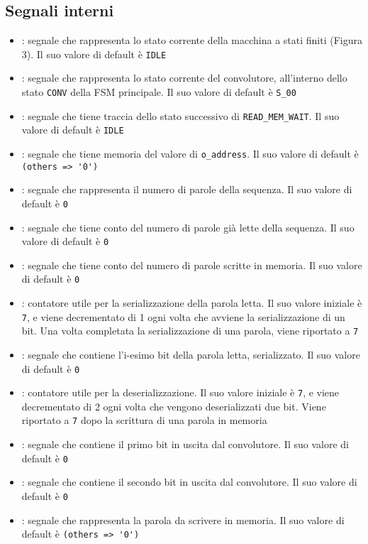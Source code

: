 \documentclass{article}
\begin{document}
\subsection{Segnali interni}
\begin{itemize}
    \item[\verb^current\_state^]: segnale che rappresenta lo stato corrente della macchina a stati finiti (Figura 3). Il suo valore di default è \verb^IDLE^
    \item[\verb^conv\_current\_state^]: segnale che rappresenta lo stato corrente del convolutore, all'interno dello stato \verb^CONV^ della FSM principale. Il suo valore di default è \verb^S_00^
    \item[\verb^return\_state^]: segnale che tiene traccia dello stato successivo di \verb^READ_MEM_WAIT^. Il suo valore di default è \verb^IDLE^
    \item[\verb^o\_address\_copy^]: segnale che tiene memoria del valore di \verb^o_address^. Il suo valore di default è \verb^(others => '0')^
    \item[\verb^words\_number^]: segnale che rappresenta il numero di parole della sequenza. Il suo valore di default è \verb^0^
    \item[\verb^count\_read^]: segnale che tiene conto del numero di parole già lette della sequenza. Il suo valore di default è \verb^0^
    \item[\verb^count\_write^]: segnale che tiene conto del numero di parole scritte in memoria. Il suo valore di default è \verb^0^
    \item[\verb^i^]: contatore utile per la serializzazione della parola letta. Il suo valore iniziale è \verb^7^, e viene decrementato di 1 ogni volta che avviene la serializzazione di un bit. Una volta completata la serializzazione di una parola, viene riportato a \verb^7^
    \item[\verb^signal\_out^]: segnale che contiene l'i-esimo bit della parola letta, serializzato. Il suo valore di default è \verb^0^
    \item[\verb^j^]: contatore utile per la deserializzazione. Il suo valore iniziale è \verb^7^, e viene decrementato di 2 ogni volta che vengono deserializzati due bit. Viene riportato a \verb^7^ dopo la scrittura di una parola in memoria
    \item[\verb^new\_out\_1^]: segnale che contiene il primo bit in uscita dal convolutore. Il suo valore di default è \verb^0^
    \item[\verb^new\_out\_2^]: segnale che contiene il secondo bit in uscita dal convolutore. Il suo valore di default è \verb^0^
    \item[\verb^new\_number^]: segnale che rappresenta la parola da scrivere in memoria. Il suo valore di default è \verb^(others => '0')^
\end{itemize}
\end{document}

